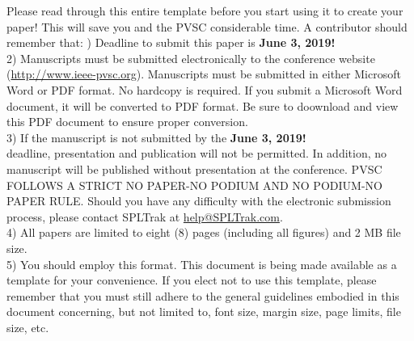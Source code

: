 \documentclass[conference]{IEEEtran}
\begin{document}
Please read through this entire template before you start using it to create your paper! This will save you and the PVSC considerable time. A contributor should remember that:
\hfil{}) Deadline to submit this paper is \textbf{June 3, 2019!}\\
2) Manuscripts must be submitted electronically to the conference website (\url{http://www.ieee-pvsc.org}).  Manuscripts must be submitted in either Microsoft Word or PDF format.  No hardcopy is required.  If you submit a Microsoft Word document, it will be converted to PDF format.  Be sure to doownload and view this PDF document to ensure proper conversion.  \\
3) If the manuscript is not submitted by the \textbf{June 3, 2019!}\\ deadline, presentation and publication will not be permitted.  In addition, no manuscript will be published without presentation at the conference.  PVSC FOLLOWS A STRICT NO PAPER-NO PODIUM AND NO PODIUM-NO PAPER RULE.  Should you have any difficulty with the electronic submission process, please contact SPLTrak at \url{help@SPLTrak.com}.\\ 
4) All papers are limited to eight (8) pages (including all figures) and 2 MB file size.\\
5)	You should employ this format. This document is being made available as a template for your convenience. If you elect not to use this template, please remember that you must still adhere to the general guidelines embodied in this document concerning, but not limited to, font size, margin size, page limits, file size, etc.\\
\end{document}
